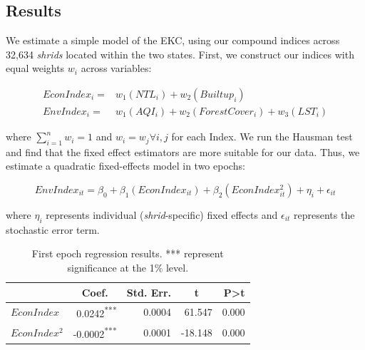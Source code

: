 \documentclass[a4paper,12pt]{article}
\begin{document}
\subsection{Results}

We estimate a simple model of the EKC, using our compound indices across 32,634 \textit{shrids} located within the two states. First, we construct our indices with equal weights $w_i$ across variables:

\begin{align*}
    EconIndex_i = & w_1(NTL_i) + w_2(Builtup_i) \\
    EnvIndex_i = & w_1(AQI_i) + w_2(ForestCover_i) + w_3(LST_i)
\end{align*}

where $\sum_{i=1}^{n}w_i = 1$ and $w_i = w_j \forall i, j$ for each Index. We run the Hausman test and find that the fixed effect estimators are more suitable for our data. Thus, we estimate a quadratic fixed-effects model in two epochs:

\[
EnvIndex_{it} = \beta_0 + \beta_1(EconIndex_{it}) + \beta_2(EconIndex_{it}^2) + \eta_i + \epsilon_{it} 
\]

where $\eta_i$ represents individual (\textit{shrid}-specific) fixed effects and $\epsilon_{it}$ represents the stochastic error term.

\begin{table}[h]
    \centering
    \begin{tabular}{l|rrrr}
    \hline
    \multicolumn{1}{c}{\textbf{}} & \multicolumn{1}{c}{\textbf{Coef.}} & \multicolumn{1}{c}{\textbf{Std. Err.}} & \multicolumn{1}{c}{\textbf{t}} & \textbf{P\textgreater{}t} \\ \hline
    $EconIndex$                     & 0.0242\textsuperscript{***}                             & 0.0004                                 & 61.547     & 0.000                     \\ 
    $EconIndex^2$                   & -0.0002\textsuperscript{***}                            & 0.0001                                 & -18.148    & 0.000                    
    \\ \hline        
\end{tabular}
\caption{First epoch regression results. *** represent significance at the 1\% level.}
\label{tab:epoch1}
\end{table}
\end{document}

